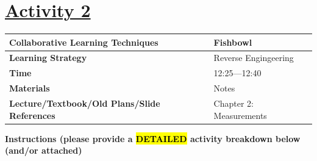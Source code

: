 \documentclass{article}
\begin{document}
\newpage
\noindent
\section*{\underline{Activity 2}}
\begin{tabular}{|p{4.2cm}|p{9.8cm}|}
\hline
\textbf{Collaborative Learning Techniques} & Fishbowl \\
\hline
\textbf{Learning Strategy} & Reverse Engingeering \\
\hline
\textbf{Time} & 12:25---12:40 \\
\hline
\textbf{Materials} & Notes \\
\hline
\textbf{Lecture/Textbook/Old Plans/Slide References} & Chapter 2: Measurements \\
\hline
\end{tabular}

\vspace{0.5cm}
\noindent

\noindent
{\large \textbf{Instructions (please provide a \hl{DETAILED} activity breakdown below (and/or attached)}} \\[0.2em]
\end{document}
